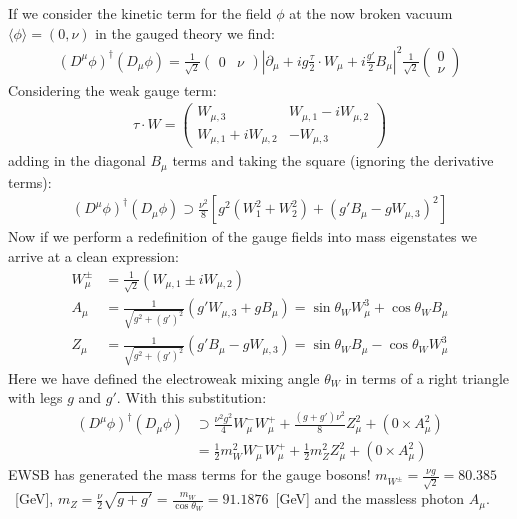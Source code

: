 If we consider the kinetic term for the field $\phi$ at the now broken vacuum $\langle \phi \rangle = (0 , \nu)$ in the gauged theory we find:
\begin{align*}
(D^\mu \phi)^\dagger (D_\mu \phi) = \frac{1}{\sqrt{2}} \left (\begin{array}{cc} 0  & \nu \end{array} \right )  \left | \partial_\mu + i g \frac{\tau}{2} \cdot W_\mu + i \frac{g'}{2} B_\mu \right|^2  \frac{1}{\sqrt{2}} \left (\begin{array}{c} 0 \\ \nu \end{array} \right ) 
\end{align*}
Considering the weak gauge term:
\begin{align*}
\tau \cdot W  = \left (\begin{array}{cc} W_{\mu,3} & W_{\mu,1} - i W_{\mu,2}  \\ W_{\mu,1}+ i W_{\mu,2} & - W_{\mu,3} \end{array} \right )
\end{align*}
adding in the diagonal $B_\mu$ terms and taking the square (ignoring the derivative terms):
\begin{align*}
(D^\mu \phi)^\dagger (D_\mu \phi) \supset \frac{\nu^2}{8} \left [g^2 (W_1^2 + W_2^2) + (g' B_\mu - g W_{\mu,3})^2 \right]
\end{align*}
Now if we perform a redefinition of the gauge fields into mass eigenstates we arrive at a clean expression:
\begin{align*}
W_{\mu}^{\pm} &= \frac{1}{\sqrt{2}}( W_{\mu,1}  \pm i W_{\mu,2} )  \\
A_{\mu} &= \frac{1}{\sqrt{g^2 + (g')^2}} (g' W_{\mu,3} + g B_\mu) = \sin \theta_W W^3_\mu + \cos \theta_W B_\mu \\
Z_{\mu} &= \frac{1}{\sqrt{g^2 + (g')^2}}( g' B_\mu - g W_{\mu,3}) = \sin \theta_W B_\mu - \cos \theta_W W_\mu^3 
\end{align*}
Here we have defined the electroweak mixing angle $\theta_W$ in terms of a right triangle with legs $g$ and $g'$. With this substitution:
\begin{align*}
(D^\mu \phi)^\dagger (D_\mu \phi) &\supset \frac{\nu^2 g^2}{4} W_{\mu}^{-} W_{\mu}^{+} + \frac{(g+g')\nu^2}{8} Z_\mu^2  + (0 \times A_\mu^2) \\ 
&= \frac{1}{2} m_{W}^2 W_\mu^- W_\mu^+ + \frac{1}{2} m_Z^2 Z_\mu^2  + (0 \times A_\mu^2)
\end{align*}
EWSB has generated the mass terms for the gauge bosons! 
$m_{W^{\pm}} = \frac{\nu g}{\sqrt{2}} = 80.385$~[GeV],
$m_Z = \frac{\nu}{2}\sqrt{g+g'} = \frac{m_W}{\cos \theta_W} = 91.1876$~[GeV]  and the massless photon $A_\mu$. 

